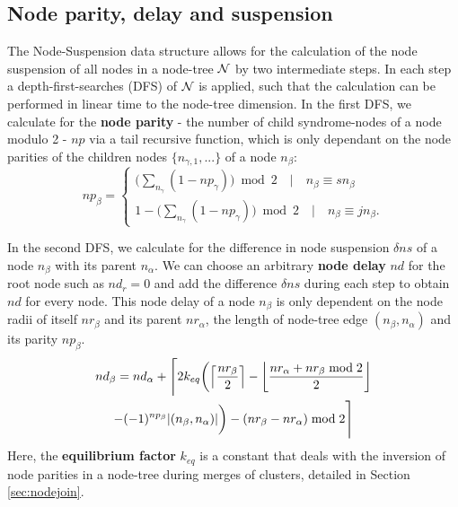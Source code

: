 \subsection{Node parity, delay and suspension}\label{sec:paritydelaysus}

The Node-Suspension data structure allows for the calculation of the node suspension of all nodes in a node-tree $\mathcal{N}$ by two intermediate steps. In each step a depth-first-searches (DFS) of $\mathcal{N}$ is applied, such that the calculation can be performed in linear time to the node-tree dimension. In the first DFS, we calculate for the \textbf{node parity} - the number of child syndrome-nodes of a node modulo 2 - $np$ via a tail recursive function, which is only dependant on the node parities of the children nodes $\{n_{\gamma,1}, ...\}$ of a node $n_\beta$:
\begin{equation}\label{eq:nodeparity}
np_\beta =
\begin{cases}
    \big( \sum_{n_\gamma} (1-np_\gamma) \big ) \bmod 2 \hspace{1em} | \hspace{1em} n_\beta \equiv sn_\beta \\
    1 - \big( \sum_{n_\gamma} (1-np_\gamma) \big ) \bmod 2 \hspace{1em} | \hspace{1em} n_\beta \equiv jn_\beta.
\end{cases} 
\end{equation}

In the second DFS, we calculate for the difference in node suspension $\delta ns$ of a node $n_\beta$ with its parent $n_\alpha$. We can choose an arbitrary \textbf{node delay} $nd$ for the root node such as $nd_r=0$ and add the difference $\delta ns$ during each step to obtain $nd$ for every node. This node delay of a node $n_\beta$ is only dependent on the node radii of itself $nr_\beta$ and its parent $nr_\alpha$, the length of node-tree edge $(n_\beta, n_\alpha)$ and its parity $np_\beta$. 
\begin{multline}\label{eq:delayequation}
    nd_\beta = nd_\alpha + \Bigg \lceil 2k_{eq}\bigg(\ceil{\frac{nr_\beta}{2}} - \floor{\frac{nr_\alpha + nr_\beta \bmod 2}{2}}\\
    - (-1)^{np_\beta}\abs{(n_\beta,n_\alpha)}\bigg) - (nr_\beta - nr_\alpha) \bmod 2 \Bigg \rceil
\end{multline}
Here, the \textbf{equilibrium factor} $k_{eq}$ is a constant that deals with the inversion of node parities in a node-tree during merges of clusters, detailed in Section \ref{sec:nodejoin}. 

